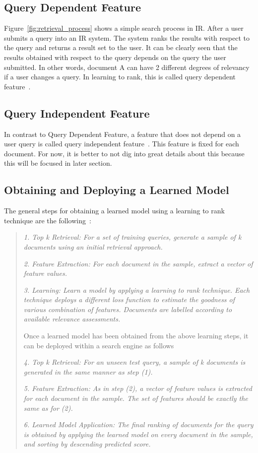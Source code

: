 \subsection{Query Dependent Feature}\label{section:querydependent}
Figure~\ref{fig:retrieval_process} shows a simple search process in IR. After a user submits a query into an IR system. The system ranks the results 
with respect to the query and returns a result set to the user. It can be clearly seen that the results obtained with respect to the query depends on the 
query the user submitted. In other words, document A can have 2 different degrees of relevancy if a user changes a query.
In learning to rank, this is called query dependent feature~\cite{craig}.

\subsection{Query Independent Feature}\label{section:queryindependent}
In contrast to Query Dependent Feature, a feature that does not depend on a user query is called query independent feature~\cite{craig}. This feature is fixed for each
document. For now, it is better to not dig into great details about this because this will be focused in later section.

\subsection{Obtaining and Deploying a Learned Model} \label{sec:learnedmodel}
The general steps for obtaining a learned model using a learning to rank technique are the following~\cite[P. 4]{learningmodel}:

\begin{quote}
  \item \textit{1. Top k Retrieval: For a set of training queries, generate a sample of k documents using an initial retrieval approach.}
  \item \textit{2. Feature Extraction: For each document in the sample, extract a vector of feature values.}
  \item \textit{3. Learning: Learn a model by applying a learning to rank technique. Each technique deploys a different loss function to estimate the goodness of
	various combination of features. Documents are labelled according to available relevance assessments.}

Once a learned model has been obtained from the above learning steps, it can be deployed within a search engine as follows~\cite[P. 4]{learningmodel}

 \item \textit{4. Top k Retrieval: For an unseen test query, a sample of k documents is generated in the same manner as step (1).}
 \item \textit{5. Feature Extraction: As in step (2), a vector of feature values is extracted for each document in the sample. The set of features should be exactly
	the same as for (2).}
 \item \textit{6. Learned Model Application: The final ranking of documents for the query is obtained by applying the learned model on every document in the sample,
	and sorting by descending predicted score.}
\end{quote}

